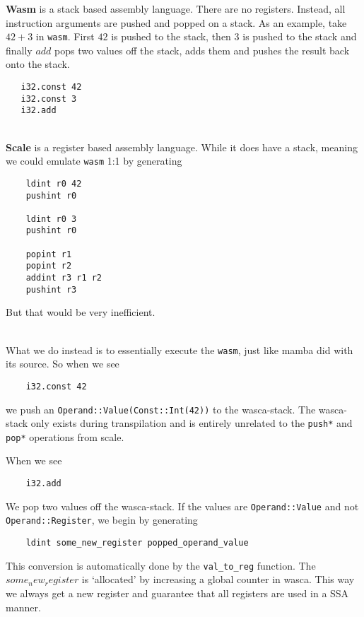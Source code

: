 \noindent
{\bf{Wasm}} is a stack based assembly language.
There are no registers. Instead, all instruction arguments are pushed and popped on a stack.
As an example, take $42 + 3$ in \verb|wasm|. First $42$ is pushed to the stack, then $3$ is pushed to the
stack and finally $add$ pops two values off the stack, adds them and pushes the result back onto the stack.

\begin{lstlisting}
   i32.const 42
   i32.const 3
   i32.add
\end{lstlisting}

~ \\

\noindent
{\bf{Scale}} is a register based assembly language.
While it does have a stack, meaning we could emulate \verb|wasm| 1:1 by generating

\begin{lstlisting}
    ldint r0 42
    pushint r0

    ldint r0 3
    pushint r0

    popint r1
    popint r2
    addint r3 r1 r2
    pushint r3
\end{lstlisting}
But that would be very inefficient.

~ \\

What we do instead is to essentially execute the \verb|wasm|, just like mamba did with its source. So when we see
\begin{lstlisting}
    i32.const 42
\end{lstlisting}
we push an \verb|Operand::Value(Const::Int(42))| to the wasca-stack.
The wasca-stack only exists during transpilation and is entirely unrelated to the \verb|push*| and \verb|pop*|
operations from scale.

When we see
\begin{lstlisting}
    i32.add
\end{lstlisting}
We pop two values off the wasca-stack. If the values are \verb|Operand::Value| and not
\verb|Operand::Register|, we begin by generating

\begin{lstlisting}
    ldint some_new_register popped_operand_value
\end{lstlisting}
This conversion is automatically done by the \verb|val_to_reg| function.
The $some_new_register$ is `allocated' by increasing a global counter in wasca.
This way we always get a new register and guarantee that all registers are used in a SSA manner.

